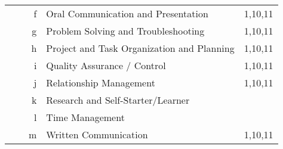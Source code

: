 \documentclass[10pt,letter]{article}
\begin{document}
{\begin{tabular}{r>{\raggedright}p{}r>{\raggedright}p{}c}
  & & f & Oral Communication and Presentation & 1,10,11 \\
  & & g & Problem Solving and Troubleshooting & 1,10,11 \\
  & & h & Project and Task Organization and Planning & 1,10,11 \\
  & & i & Quality Assurance / Control & 1,10,11 \\
  & & j & Relationship Management & 1,10,11 \\
  & & k & Research and Self-Starter/Learner & \\
  & & l & Time Management & \\
  & & m & Written Communication & 1,10,11 \\
\end{tabular}
}%
\end{document}
